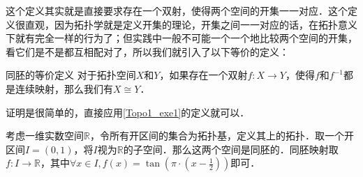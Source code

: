 这个定义其实就是直接要求存在一个双射，使得两个空间的开集一一对应．这个定义很直观，因为拓扑学就是定义开集的理论，开集之间一一对应的话，在拓扑意义下就有完全一样的行为了；但实践中一般不可能一个一个地比较两个空间的开集，看它们是不是都互相配对了，所以我们就引入了以下等价的定义：

\begin{theorem}{同胚的等价定义}
对于拓扑空间$X$和$Y$，如果存在一个双射$f:X\rightarrow Y$，使得$f$和$f^{-1}$都是连续映射，那么我们有$X\cong Y$．
\end{theorem}

证明是很简单的，直接应用\autoref{Topo1_exe1}的定义就可以．

\begin{example}{}\label{Topo1_ex1}
考虑一维实数空间$\mathbb{R}$，令所有开区间的集合为拓扑基，定义其上的拓扑．取一个开区间$I=(0, 1)$，将$I$视为$\mathbb{R}$的子空间．那么这两个空间是同胚的．同胚映射取$f:I\rightarrow\mathbb{R}$，其中$\forall x\in I, f(x)=\tan{(\pi\cdot(x-\frac{1}{2}))}$即可．
\end{example}
